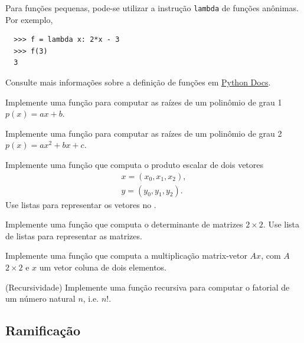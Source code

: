 \documentclass[12pt]{article}
\begin{document}
\begin{obs}
  Para funções pequenas, pode-se utilizar a instrução \lstinline+lambda+ de funções anônimas. Por exemplo,
  \begin{lstlisting}
  >>> f = lambda x: 2*x - 3
  >>> f(3)
  3
  \end{lstlisting}
\end{obs}

\begin{obs}
  Consulte mais informações sobre a definição de funções em \href{https://docs.python.org/3/tutorial/controlflow.html#defining-functions}{Python Docs}.
\end{obs}

\begin{exr}
  Implemente uma função para computar as raízes de um polinômio de grau 1 $p(x) = ax + b$.
\end{exr}

\begin{exr}
  Implemente uma função para computar as raízes de um polinômio de grau 2 $p(x) = ax^2 + bx + c$.
\end{exr}

\begin{exr}
  Implemente uma função que computa o produto escalar de dois vetores
  \begin{gather}
    x = (x_0, x_1, x_2),\\
    y = (y_0, y_1, y_2).
  \end{gather}
  Use listas para representar os vetores no {\python}.
\end{exr}

\begin{exr}
  Implemente uma função que computa o determinante de matrizes $2\times 2$. Use lista de listas para representar as matrizes.
\end{exr}

\begin{exr}
  Implemente uma função que computa a multiplicação matrix-vetor $Ax$, com $A$ $2\times 2$ e $x$ um vetor coluna de dois elementos.
\end{exr}

\begin{exr}(Recursividade) Implemente uma função recursiva para computar o fatorial de um número natural $n$, i.e. $n!$.  
\end{exr}

\subsection{Ramificação}
\end{document}
